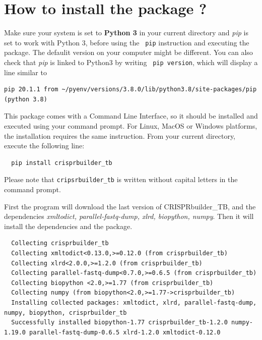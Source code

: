 \documentclass[twoside,a4paper,11pt,frenchb,openany]{report}
\begin{document}
    \section{How to install the package
?}\label{how-to-install-the-package}

Make sure your system is set to \textbf{Python 3} in your current directory and \textit{pip} is set to work with Python 3, before using the \texttt{ pip} instruction and executing the package. The defaulit version on your computer might be different. You can also check that \textit{pip} is linked to Python3 by writing \texttt{ pip \textemdash \textemdash version}, which will display a line similar to

\begin{verbatim}
pip 20.1.1 from ~/pyenv/versions/3.8.0/lib/python3.8/site-packages/pip (python 3.8)
\end{verbatim}

    This package comes with a Command Line Interface, so it should be
installed and executed using your command prompt. For Linux, MacOS or
Windows platforms, the installation requires the same instruction. From your current directory, execute the following line:

    \begin{verbatim}
  pip install crisprbuilder_tb
\end{verbatim}

    Please note that \texttt{cripsrbuilder\_tb} is written without capital
letters in the command prompt.

First the program will download the last version of CRISPRbuilder\_TB, and the dependencies \textit{xmltodict, parallel-fastq-dump, xlrd, biopython, numpy}. Then it will install the dependencies and the package.

\begin{verbatim}  Collecting crisprbuilder_tb
  Collecting xmltodict<0.13.0,>=0.12.0 (from crisprbuilder_tb)
  Collecting xlrd<2.0.0,>=1.2.0 (from crisprbuilder_tb)
  Collecting parallel-fastq-dump<0.7.0,>=0.6.5 (from crisprbuilder_tb)
  Collecting biopython <2.0,>=1.77 (from crisprbuilder_tb)
  Collecting numpy (from biopython<2.0,>=1.77->crisprbuilder_tb)
  Installing collected packages: xmltodict, xlrd, parallel-fastq-dump, numpy, biopython, crisprbuilder_tb
  Successfully installed biopython-1.77 crisprbuilder_tb-1.2.0 numpy-1.19.0 parallel-fastq-dump-0.6.5 xlrd-1.2.0 xmltodict-0.12.0
\end{verbatim}
\end{document}
